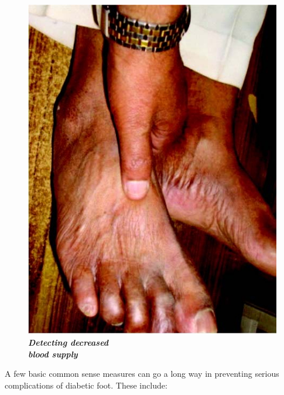 \begin{figure}[h]
\centering
\includegraphics[scale=.8]{images/064.jpg}\\
\textbf{\textit{Detecting decreased\\ blood supply}}
\end{figure}

A few basic common sense measures can go a long way in preve\-nting serious complications of diabetic foot. These include:

